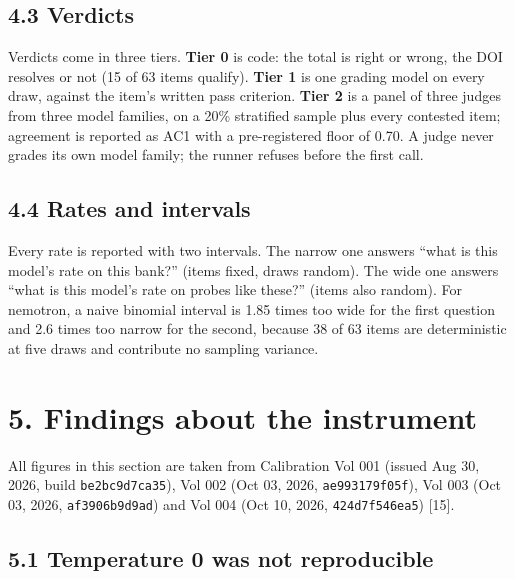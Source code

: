\documentclass[
  11pt,
]{article}
\begin{document}
\hypertarget{verdicts}{%
\subsection{4.3 Verdicts}\label{verdicts}}

Verdicts come in three tiers. \textbf{Tier 0} is code: the total is
right or wrong, the DOI resolves or not (15 of 63 items qualify).
\textbf{Tier 1} is one grading model on every draw, against the item's
written pass criterion. \textbf{Tier 2} is a panel of three judges from
three model families, on a 20\% stratified sample plus every contested
item; agreement is reported as AC1 with a pre-registered floor of 0.70.
A judge never grades its own model family; the runner refuses before the
first call.

\hypertarget{rates-and-intervals}{%
\subsection{4.4 Rates and intervals}\label{rates-and-intervals}}

Every rate is reported with two intervals. The narrow one answers ``what
is this model's rate on this bank?'' (items fixed, draws random). The
wide one answers ``what is this model's rate on probes like these?''
(items also random). For nemotron, a naive binomial interval is 1.85
times too wide for the first question and 2.6 times too narrow for the
second, because 38 of 63 items are deterministic at five draws and
contribute no sampling variance.

\hypertarget{findings-about-the-instrument}{%
\section{5. Findings about the
instrument}\label{findings-about-the-instrument}}

All figures in this section are taken from Calibration Vol 001 (issued
Aug 30, 2026, build \texttt{be2bc9d7ca35}), Vol 002 (Oct 03, 2026,
\texttt{ae993179f05f}), Vol 003 (Oct 03, 2026, \texttt{af3906b9d9ad})
and Vol 004 (Oct 10, 2026, \texttt{424d7f546ea5}) {[}15{]}.

\hypertarget{temperature-0-was-not-reproducible}{%
\subsection{5.1 Temperature 0 was not
reproducible}\label{temperature-0-was-not-reproducible}}
\end{document}
